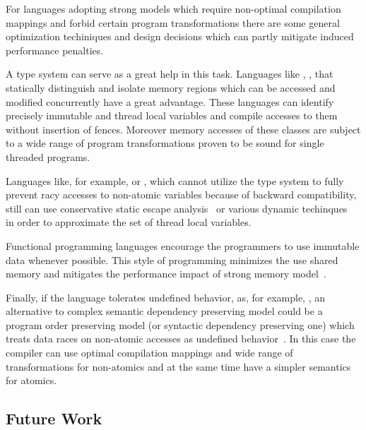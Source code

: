 For languages adopting strong models which require non-optimal
compilation mappings and forbid certain program transformations
there are some general optimization techiniques and design decisions
which can partly mitigate induced performance penalties.

A type system can serve as a great help in this task. 
Languages like \Haskell, \OCaml, \Rust that 
statically distinguish and isolate memory regions 
which can be accessed and modified concurrently have a great advantage.
These languages can identify precisely 
immutable and thread local variables
and compile accesses to them without insertion of fences.
Moreover memory accesses of these classes are subject to 
a wide range of program transformations proven to be
sound for single threaded programs. 
 
Languages like, for example, \Java or \Kotlin, which cannot utilize the type system 
to fully prevent racy accesses to non-atomic variables 
because of backward compatibility, still can 
use conservative static escape analysis~\cite{Choi-al:OOPSLA1999}
or various dynamic techinques~\cite{Liu-al:PLDI19} 
in order to approximate the set of thread local variables.   

Functional programming languages encourage 
the programmers to use immutable data whenever possible.
This style of programming minimizes the use 
shared memory and mitigates the performance impact 
of strong memory model~\cite{Vollmer-al:PPoPP17}. 

Finally, if the language tolerates undefined behavior, as, for example, \CPP, 
an alternative to complex semantic dependency preserving model
could be a program order preserving model (or syntactic dependency preserving one) 
which treats data races on non-atomic accesses as 
undefined behavior~\cite{Boehm-Demsky:MSPC14, Ou-Demsky:OOPSLA18}.
In this case the compiler can use optimal compilation mappings 
and wide range of transformations for non-atomics 
and at the same time have a simpler semantics for atomics. 

\subsection{Future Work}

